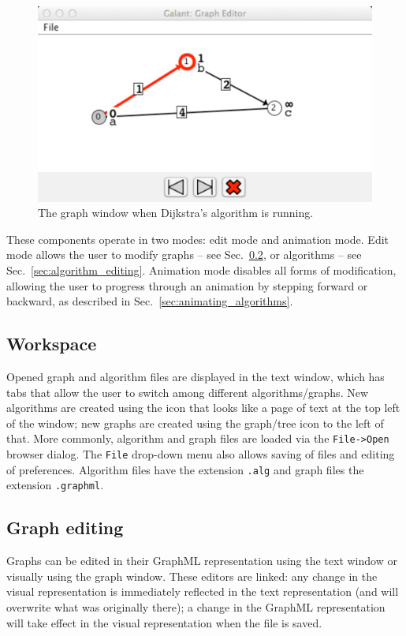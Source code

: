 \begin{figure}[p!]
\includegraphics[scale=0.5]{X_dijkstra_running}
\caption{The graph window when Dijkstra's algorithm is running.}
\label{fig:dijkstra_running}
\end{figure}

These components operate in two modes: edit mode and animation mode.
Edit mode allows the user to modify graphs -- see Sec.~\ref{sec:graph_editing},
or algorithms -- see Sec.~\ref{sec:algorithm_editing}. Animation mode disables all forms of modification, allowing the user to progress through
an animation by stepping forward or backward, as described in
Sec.~\ref{sec:animating_algorithms}.

\subsection{Workspace}

Opened graph and algorithm files are displayed in the text window,
which has tabs that allow the user to switch among different algorithms/graphs.
New algorithms are created using the icon that looks like
a page of text at the top left of the
window; new graphs are created
using the graph/tree icon to the left of that.
More commonly, algorithm and graph files are loaded via the \texttt{File->Open}
browser dialog. The \texttt{File} drop-down menu also allows saving of files
and editing of preferences. Algorithm files have the extension \texttt{.alg}
and graph files the extension \texttt{.graphml}.

\subsection{Graph editing}
\label{sec:graph_editing}

Graphs can be edited in their GraphML representation using the text window
or visually using the graph window.
These editors are linked:
any change in the visual representation is immediately reflected in the text
representation (and will overwrite what was originally there);
a change in the GraphML representation will take effect in the visual representation
when the file is saved.


